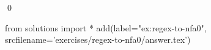 
\begin{ex} 
  \label{ex:regex-to-nfa0}
  
  \qed
\end{ex} 
\begin{python0}
from solutions import *
add(label="ex:regex-to-nfa0",
    srcfilename='exercises/regex-to-nfa0/answer.tex') 
\end{python0}

